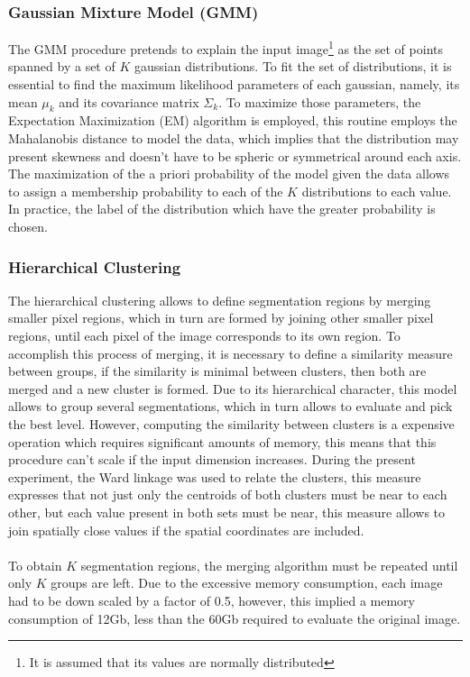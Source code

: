 \documentclass[10pt,twocolumn,letterpaper]{article}
\begin{document}
\subsubsection*{Gaussian Mixture Model (GMM)}
The GMM procedure pretends to explain the input image\footnote{It is assumed that its values are normally distributed} as the set of points spanned by a set of $K$ gaussian distributions. To fit the set of distributions, it is essential to find the maximum likelihood parameters of each gaussian, namely, its mean $\mu_k$ and its covariance matrix $\Sigma_{k}$. To maximize those parameters, the Expectation Maximization (EM) algorithm is employed, this routine employs the Mahalanobis distance to model the data, which implies that the distribution may present skewness and doesn't have to be spheric or symmetrical around each axis. The maximization of the a priori probability of the model given the data allows to assign a membership probability to each of the $K$ distributions to each value. In practice, the label of the distribution which have the greater probability is chosen. 

\subsubsection*{Hierarchical Clustering}
The hierarchical clustering allows to define segmentation regions by merging smaller pixel regions, which in turn are formed by joining other smaller pixel regions, until each pixel of the image corresponds to its own region. To accomplish this process of merging, it is necessary to define a similarity measure between groups, if the similarity is minimal between clusters, then both are merged and a new cluster is formed. Due to its hierarchical character, this model allows to group several segmentations, which in turn allows to evaluate and pick the best level. However, computing the similarity between clusters is a expensive operation which requires significant amounts of memory, this means that this procedure can't scale if the input dimension increases. During the present experiment, the Ward linkage was used to relate the clusters, this measure expresses that not just only the centroids of both clusters must be near to each other, but each value present in both sets must be near, this measure allows to join spatially close values if the spatial coordinates are included.
\\
\\
To obtain $K$ segmentation regions, the merging algorithm must be repeated until only $K$ groups are left. Due to the excessive memory consumption, each image had to be down scaled by a factor of 0.5, however, this implied a memory consumption of 12Gb, less than the 60Gb required to evaluate the original image. 
\end{document}
